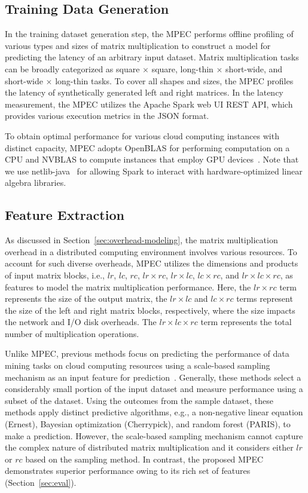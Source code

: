 \documentclass[10pt, conference, compsocconf]{IEEEtran}
\begin{document}
\subsection{Training Data Generation}\label{sec:train-data}
In the training dataset generation step, the MPEC performs offline profiling of various types and sizes of matrix multiplication to construct a model for predicting the latency of an arbitrary input dataset. Matrix multiplication tasks can be broadly categorized as  square $\times$ square, long-thin $\times$ short-wide, and short-wide $\times$ long-thin tasks. To cover all shapes and sizes, the MPEC profiles the latency of synthetically generated left and right matrices. In the latency measurement, the MPEC utilizes the Apache Spark web UI REST API, which provides various execution metrics in the JSON format.

To obtain optimal performance for various cloud computing instances with distinct capacity, MPEC adopts OpenBLAS for performing computation on a CPU and NVBLAS to compute instances that employ GPU devices~\cite{NVBLAS}. Note that we use netlib-java~\cite{fatman-littleboy} for allowing Spark to interact with hardware-optimized linear algebra libraries.

\subsection{Feature Extraction}\label{sec:features}
As discussed in Section~\ref{sec:overhead-modeling}, the matrix multiplication overhead in a distributed computing environment involves various resources. To account for such diverse overheads, MPEC utilizes the dimensions and products of input matrix blocks, i.e., $lr$, $lc$, $rc$, $lr \times rc$, $lr \times lc$, $lc \times rc$, and $lr \times lc \times rc$, as features to model the matrix multiplication performance. Here, the $lr \times rc$ term represents the size of the output matrix, the $lr \times lc$ and $lc \times rc$ terms represent the size of the left and right matrix blocks, respectively, where the size impacts the network and I/O disk overheads. The $lr \times lc \times rc$ term represents the total number of multiplication operations.

Unlike MPEC, previous methods focus on predicting the performance of data mining tasks on cloud computing resources using a scale-based sampling mechanism as an input feature for prediction~\cite{cherrypick, ernest, paris}. Generally, these methods select a considerably small portion of the input dataset and measure performance using a subset of the dataset. Using the outcomes from the sample dataset, these methods apply distinct predictive algorithms, e.g., a non-negative linear equation (Ernest), Bayesian optimization (Cherrypick), and random forest (PARIS), to make a prediction. However, the scale-based sampling mechanism cannot capture the complex nature of distributed matrix multiplication and it considers either $lr$ or $rc$ based on the sampling method. In contrast, the proposed MPEC demonstrates superior performance owing to its rich set of features (Section~\ref{sec:eval}).
\end{document}
